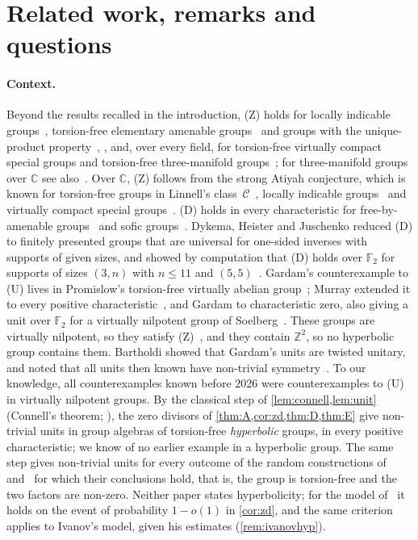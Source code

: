 \documentclass[11pt]{article}
\theoremstyle{definition}
\theoremstyle{plain}
\newcommand{\F}{\mathbb{F}}
\newcommand{\Z}{\mathbb{Z}}
\newcommand{\C}{\mathbb{C}}
\begin{document}
\section{Related work, remarks and questions}\label{sec:remarks}

\paragraph{Context.} Beyond the results recalled in the introduction, (Z) holds for locally indicable groups~\cite{Higman1940}, torsion-free elementary amenable groups~\cite{KrophollerLinnellMoody1988} and groups with the unique-product property~\cite{Cohen1974}, \cite[Ch.~13]{Passman1977}, and, over every field, for torsion-free virtually compact special groups and torsion-free three-manifold groups~\cite[Thm.~1.3(1) and Cor.~1.5]{FisherSanchezPeralta2026}; for three-manifold groups over $\C$ see also~\cite{KielakLinton2024}. Over $\C$, (Z) follows from the strong Atiyah conjecture, which is known for torsion-free groups in Linnell's class~$\mathcal C$~\cite{Linnell1993}, locally indicable groups~\cite{JZLA2020} and virtually compact special groups~\cite{Schreve2014}. (D) holds in every characteristic for free-by-amenable groups~\cite{AraOMearaPerera2002} and sofic groups~\cite[Cor.~4.7]{ElekSzabo2004}. Dykema, Heister and Juschenko reduced (D) to finitely presented groups that are universal for one-sided inverses with supports of given sizes, and showed by computation that (D) holds over $\F_2$ for supports of sizes $(3,n)$ with $n\le11$ and $(5,5)$~\cite{DHJ2015}. Gardam's counterexample to (U) lives in Promislow's torsion-free virtually abelian group~\cite{Promislow1988,Gardam2021}; Murray extended it to every positive characteristic~\cite{Murray2021}, and Gardam to characteristic zero, also giving a unit over $\F_2$ for a virtually nilpotent group of Soelberg~\cite[Thms.~A and~B]{Gardam2024}. These groups are virtually nilpotent, so they satisfy (Z)~\cite{KrophollerLinnellMoody1988}, and they contain $\Z^2$, so no hyperbolic group contains them. Bartholdi showed that Gardam's units are twisted unitary, and noted that all units then known have non-trivial symmetry~\cite{Bartholdi2023}. To our knowledge, all counterexamples known before 2026 were counterexamples to (U) in virtually nilpotent groups. By the classical step of \cref{lem:connell,lem:unit} (Connell's theorem; \cite[Lemma~13.1.2]{Passman1977}), the zero divisors of \cref{thm:A,cor:zd,thm:D,thm:E} give non-trivial units in group algebras of torsion-free \emph{hyperbolic} groups, in every positive characteristic; we know of no earlier example in a hyperbolic group. The same step gives non-trivial units for every outcome of the random constructions of~\cite{OAI196} and~\cite{Ivanov2026} for which their conclusions hold, that is, the group is torsion-free and the two factors are non-zero. Neither paper states hyperbolicity; for the model of~\cite{OAI196} it holds on the event of probability $1-o(1)$ in \cref{cor:zd}, and the same criterion applies to Ivanov's model, given his estimates (\cref{rem:ivanovhyp}).
\end{document}
